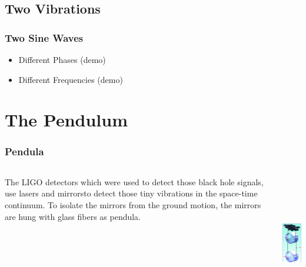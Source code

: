 \documentclass[pdf,hideothersubsections]{beamer}
\begin{document}
\subsection{Two Vibrations}
\begin{frame}
\frametitle{Two Sine Waves}

\begin{itemize}
\item Different Phases (demo)
\item Different Frequencies (demo)
\end{itemize}

\end{frame}



\section{The Pendulum}
\begin{frame}
\frametitle{Pendula}

\begin{columns}[T]
   \begin{column}{0.5\textwidth}
    The LIGO detectors which were used to detect those black hole signals, use lasers and mirrors\footnotemark to detect those tiny vibrations in the space-time continuum. To isolate the mirrors from the ground motion, the mirrors are hung with 
glass fibers as pendula\footnotemark.

   \end{column}

   \pause
   \begin{column}{0.5\textwidth}
   \includegraphics[height=6cm]{LIGO-Pendulum-diagram.png}      

   \end{column}
  
\end{columns}

\end{frame}
\end{document}

